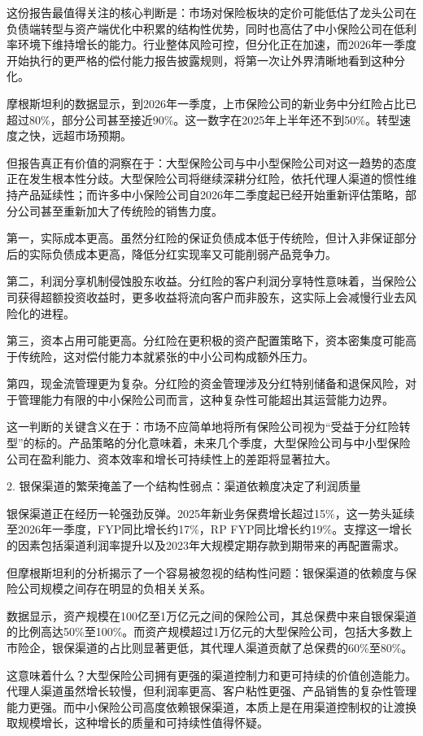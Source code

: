 \documentclass[11pt]{ctexart}
\begin{document}
这份报告最值得关注的核心判断是：市场对保险板块的定价可能低估了龙头公司在负债端转型与资产端优化中积累的结构性优势，同时也高估了中小保险公司在低利率环境下维持增长的能力。行业整体风险可控，但分化正在加速，而2026年一季度开始执行的更严格的偿付能力报告披露规则，将第一次让外界清晰地看到这种分化。

摩根斯坦利的数据显示，到2026年一季度，上市保险公司的新业务中分红险占比已超过80\%，部分公司甚至接近90\%。这一数字在2025年上半年还不到50\%。转型速度之快，远超市场预期。

但报告真正有价值的洞察在于：大型保险公司与中小型保险公司对这一趋势的态度正在发生根本性分歧。大型保险公司将继续深耕分红险，依托代理人渠道的惯性维持产品延续性；而许多中小保险公司自2026年二季度起已经开始重新评估策略，部分公司甚至重新加大了传统险的销售力度。

第一，实际成本更高。虽然分红险的保证负债成本低于传统险，但计入非保证部分后的实际负债成本更高，降低分红实现率又可能削弱产品竞争力。

第二，利润分享机制侵蚀股东收益。分红险的客户利润分享特性意味着，当保险公司获得超额投资收益时，更多收益将流向客户而非股东，这实际上会减慢行业去风险化的进程。

第三，资本占用可能更高。分红险在更积极的资产配置策略下，资本密集度可能高于传统险，这对偿付能力本就紧张的中小公司构成额外压力。

第四，现金流管理更为复杂。分红险的资金管理涉及分红特别储备和退保风险，对于管理能力有限的中小保险公司而言，这种复杂性可能超出其运营能力边界。

这一判断的关键含义在于：市场不应简单地将所有保险公司视为“受益于分红险转型”的标的。产品策略的分化意味着，未来几个季度，大型保险公司与中小型保险公司在盈利能力、资本效率和增长可持续性上的差距将显著拉大。

2. 银保渠道的繁荣掩盖了一个结构性弱点：渠道依赖度决定了利润质量

银保渠道正在经历一轮强劲反弹。2025年新业务保费增长超过15\%，这一势头延续至2026年一季度，FYP同比增长约17\%，RP FYP同比增长约19\%。支撑这一增长的因素包括渠道利润率提升以及2023年大规模定期存款到期带来的再配置需求。

但摩根斯坦利的分析揭示了一个容易被忽视的结构性问题：银保渠道的依赖度与保险公司规模之间存在明显的负相关关系。

数据显示，资产规模在100亿至1万亿元之间的保险公司，其总保费中来自银保渠道的比例高达50\%至100\%。而资产规模超过1万亿元的大型保险公司，包括大多数上市险企，银保渠道的占比则显著更低，其代理人渠道贡献了总保费的60\%至80\%。

这意味着什么？大型保险公司拥有更强的渠道控制力和更可持续的价值创造能力。代理人渠道虽然增长较慢，但利润率更高、客户粘性更强、产品销售的复杂性管理能力更强。而中小保险公司高度依赖银保渠道，本质上是在用渠道控制权的让渡换取规模增长，这种增长的质量和可持续性值得怀疑。
\end{document}
